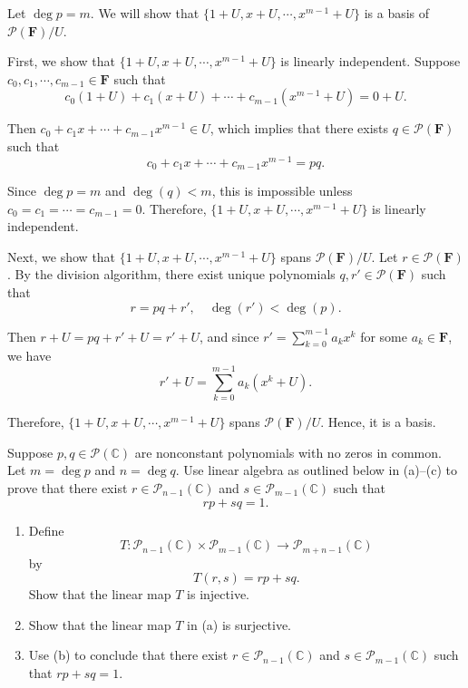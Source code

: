 \documentclass{article}
\begin{document}
\begin{solution}
  Let \( \deg p = m \). We will show that \( \{1+U,x+U,\cdots,x^{m-1}+U\} \) is a basis of \( \mathcal{P}(\mathbf{F})/U \). \par
  First, we show that \( \{1+U,x+U,\cdots,x^{m-1}+U\} \) is linearly independent. Suppose \( c_0,c_1,\cdots,c_{m-1}\in \mathbf{F} \) such that
  \[ c_0(1+U)+c_1(x+U)+\cdots+c_{m-1}(x^{m-1}+U)=0+U. \] \par
  Then \( c_0+c_1x+\cdots+c_{m-1}x^{m-1}\in U \), which implies that there exists \( q\in \mathcal{P}(\mathbf{F}) \) such that
  \[ c_0+c_1x+\cdots+c_{m-1}x^{m-1}=pq. \] \par
  Since \( \deg p = m \) and \( \deg(q) < m \), this is impossible unless \( c_0=c_1=\cdots=c_{m-1}=0 \). Therefore, \( \{1+U,x+U,\cdots,x^{m-1}+U\} \) is linearly independent. \par
  Next, we show that \( \{1+U,x+U,\cdots,x^{m-1}+U\} \) spans \( \mathcal{P}(\mathbf{F})/U \). Let \( r\in \mathcal{P}(\mathbf{F}) \). By the division algorithm, there exist unique polynomials \( q,r'\in \mathcal{P}(\mathbf{F}) \) such that
  \[ r=pq+r', \quad \deg(r')<\deg(p). \] \par
  Then \( r+U=pq+r'+U=r'+U \), and since \( r'=\sum_{k=0}^{m-1}a_kx^k \) for some \( a_k\in \mathbf{F} \),
  we have
 \[ r'+U=\sum_{k=0}^{m-1}a_k(x^k+U). \] \par
  Therefore, \( \{1+U,x+U,\cdots,x^{m-1}+U\} \) spans \( \mathcal{P}(\mathbf{F})/U \). Hence, it is a basis.
\end{solution}

\begin{problem}[4-14]
  Suppose $p,q\in\mathcal{P}(\mathbb{C})$ are nonconstant polynomials with no
  zeros in common. Let $m=\deg p$ and $n=\deg q$. Use linear algebra as outlined
  below in (a)--(c) to prove that there exist
  $r\in\mathcal{P}_{n-1}(\mathbb{C})$ and $s\in\mathcal{P}_{m-1}(\mathbb{C})$ such
  that
  \[
  rp+sq=1.
  \]
  \begin{enumerate}[label=(\alph*)]
    \item Define
    \[
    T:\mathcal{P}_{n-1}(\mathbb{C})\times\mathcal{P}_{m-1}(\mathbb{C})
    \to\mathcal{P}_{m+n-1}(\mathbb{C})
    \]
    by
    \[
    T(r,s)=rp+sq.
    \]
    Show that the linear map $T$ is injective.
    \item Show that the linear map $T$ in (a) is surjective.
    \item Use (b) to conclude that there exist
    $r\in\mathcal{P}_{n-1}(\mathbb{C})$ and $s\in\mathcal{P}_{m-1}(\mathbb{C})$ such
    that $rp+sq=1$.
  \end{enumerate}
\end{problem}
\end{document}
